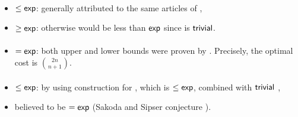 \paragraph{\TNFA{}\tto\ODFA}\label{cost:2NFAto1DFA}
\begin{itemize}
	\item $\le\mathsf{exp}$: generally attributed to the same articles of \hyperref[cost:2DFAto1DFA]{\TDFA{}\tto\ODFA},
	\item $\ge\mathsf{exp}$: otherwise \hyperref[cost:1NFAto1DFA]{\ONFA{}\tto\ODFA} would be less than $\mathsf{exp}$ since \ONFA{}\tto\TNFA is $\mathsf{trivial}$.
\end{itemize}
\paragraph{\TNFA{}\tto\ONFA}
\begin{itemize}
	\item $=\mathsf{exp}$: both upper and lower bounds were proven by . Precisely, the optimal cost is $\binom{2n}{n+1}$.
\end{itemize}
\paragraph{\TNFA{}\tto\TDFA}
\begin{itemize}
	\item $\le\mathsf{exp}$: by using construction for \hyperref[cost:2NFAto1DFA]{\TNFA{}\tto\ODFA}, which is $\le\mathsf{exp}$, combined with $\mathsf{trivial}$ \ODFA{}\tto\TDFA,
	\item believed to be $=\mathsf{exp}$ (Sakoda and Sipser conjecture \cite{SakSip78}).
\end{itemize}


